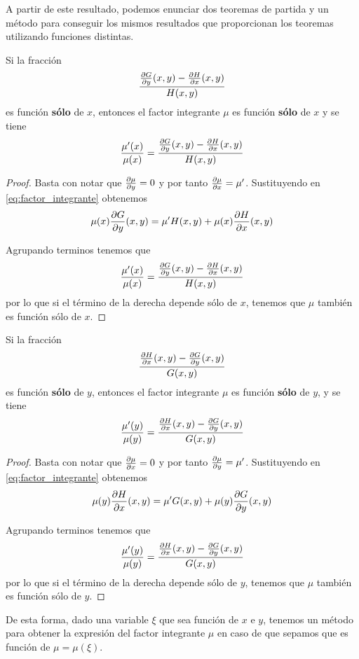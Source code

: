 \documentclass{mathnotes}
\begin{document}
A partir de este resultado, podemos enunciar dos teoremas de partida y un método para conseguir los mismos resultados que proporcionan los teoremas utilizando funciones distintas.

\begin{theorem}
Si la fracción $$\frac{\partialder{y}{G}(x,y)-\partialder{x}{H}(x,y)}{H(x,y)}$$ es función \textbf{sólo} de $x$, entonces el factor integrante $\mu$ es función \textbf{sólo} de $x$ y se tiene $$\frac{\mu^\prime(x)}{\mu(x)} = \frac{\partialder{y}{G}(x,y)-\partialder{x}{H}(x,y)}{H(x,y)}$$
\end{theorem}
\begin{proof}
Basta con notar que $\partialder{y}{\mu} = 0$ y por tanto $\partialder{x}{\mu} = \mu^\prime$.
Sustituyendo en \ref{eq:factor_integrante} obtenemos $$\mu(x)\partialder{y}{G}(x,y) = \mu^\prime H(x,y)+\mu(x) \partialder{x}{H}(x,y)$$

Agrupando terminos tenemos que 
$$\frac{\mu^\prime(x)}{\mu(x)} = \frac{\partialder{y}{G}(x,y)-\partialder{x}{H}(x,y)}{H(x,y)}$$
por lo que si el término de la derecha depende sólo de $x$, tenemos que $\mu$ también es función sólo de $x$.
\end{proof}

\newpage
\begin{theorem}
Si la fracción $$\frac{\partialder{x}{H}(x,y)-\partialder{y}{G}(x,y)}{G(x,y)}$$ es función \textbf{sólo} de $y$, entonces el factor integrante $\mu$ es función \textbf{sólo} de $y$, y se tiene
$$\frac{\mu^\prime(y)}{\mu(y)} = \frac{\partialder{x}{H}(x,y)-\partialder{y}{G}(x,y)}{G(x,y)}$$
\end{theorem}

\begin{proof}
Basta con notar que $\partialder{x}{\mu} = 0$ y por tanto $\partialder{y}{\mu} = \mu^\prime$.
Sustituyendo en \ref{eq:factor_integrante} obtenemos $$\mu(y)\partialder{x}{H}(x,y) = \mu^\prime G(x,y)+\mu(y) \partialder{y}{G}(x,y)$$

Agrupando terminos tenemos que 
$$\frac{\mu^\prime(y)}{\mu(y)} = \frac{\partialder{x}{H}(x,y)-\partialder{y}{G}(x,y)}{G(x,y)}$$
por lo que si el término de la derecha depende sólo de $y$, tenemos que $\mu$ también es función sólo de $y$.
\end{proof}

De esta forma, dado una variable $\xi$ que sea función de $x$ e $y$, tenemos un método para obtener la expresión del factor integrante $\mu$ en caso de que sepamos que es función de $\mu = \mu(\xi)$.
\end{document}
